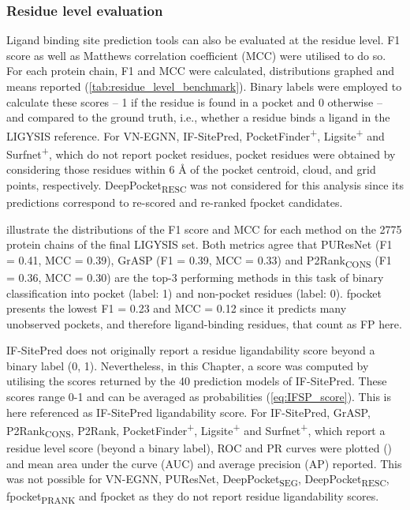 \subsubsection{Residue level evaluation}

Ligand binding site prediction tools can also be evaluated at the residue level. F1 score as well as Matthews correlation coefficient (MCC) were utilised to do so. For each protein chain, F1 and MCC were calculated, distributions graphed and means reported (\autoref{tab:residue_level_benchmark}). Binary labels were employed to calculate these scores -- 1 if the residue is found in a pocket and 0 otherwise -- and compared to the ground truth, i.e., whether a residue binds a ligand in the LIGYSIS reference. For VN-EGNN, IF-SitePred, PocketFinder\textsuperscript{+}, Ligsite\textsuperscript{+} and Surfnet\textsuperscript{+}, which do not report pocket residues, pocket residues were obtained by considering those residues within 6 \AA{} of the pocket centroid, cloud, and grid points, respectively. DeepPocket\textsubscript{RESC} was not considered for this analysis since its predictions correspond to re-scored and re-ranked fpocket candidates.

 illustrate the distributions of the F1 score and MCC for each method on the 2775 protein chains of the final LIGYSIS set. Both metrics agree that PUResNet (F1 = 0.41, MCC = 0.39), GrASP (F1 = 0.39, MCC = 0.33) and P2Rank\textsubscript{CONS} (F1 = 0.36, MCC = 0.30) are the top-3 performing methods in this task of binary classification into pocket (label: 1) and non-pocket residues (label: 0). fpocket presents the lowest F1 = 0.23 and MCC = 0.12 since it predicts many unobserved pockets, and therefore ligand-binding residues, that count as FP here.

IF-SitePred does not originally report a residue ligandability score beyond a binary label (0, 1). Nevertheless, in this Chapter, a score was computed by utilising the scores returned by the 40 prediction models of IF-SitePred. These scores range 0-1 and can be averaged as probabilities (\autoref{eq:IFSP_score}). This is here referenced as IF-SitePred ligandability score. For IF-SitePred, GrASP, P2Rank\textsubscript{CONS}, P2Rank, PocketFinder\textsuperscript{+}, Ligsite\textsuperscript{+} and Surfnet\textsuperscript{+}, which report a residue level score (beyond a binary label), ROC and PR curves were plotted () and mean area under the curve (AUC) and average precision (AP) reported. This was not possible for VN-EGNN, PUResNet, DeepPocket\textsubscript{SEG}, DeepPocket\textsubscript{RESC}, fpocket\textsubscript{PRANK} and fpocket as they do not report residue ligandability scores.

